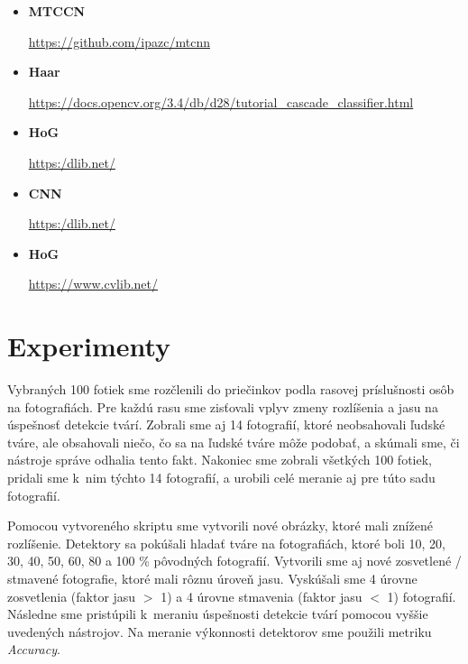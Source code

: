 \documentclass[]{article}
\begin{document}
	\begin{itemize}
		\item \textbf{MTCCN}
		
		\url{https://github.com/ipazc/mtcnn}
		
		\item \textbf{Haar}
		
		\url{https://docs.opencv.org/3.4/db/d28/tutorial_cascade_classifier.html}
		
		\item \textbf{HoG}
		
		\url{https:/dlib.net/}
		
		\item \textbf{CNN}
		
		\url{https:/dlib.net/}
		
		\item \textbf{HoG}
		
		\url{https://www.cvlib.net/}
	\end{itemize}
	
	\section{Experimenty}
	
	Vybraných 100 fotiek sme rozčlenili do priečinkov podla rasovej príslušnosti osôb na fotografiách. Pre každú rasu sme zisťovali vplyv zmeny rozlíšenia a jasu na úspešnosť detekcie tvárí. Zobrali sme aj 14 fotografií, ktoré neobsahovali ľudské tváre, ale obsahovali niečo, čo sa na ľudské tváre môže podobať, a skúmali sme, či nástroje správe odhalia tento fakt. Nakoniec sme zobrali všetkých 100 fotiek, pridali sme k~nim týchto 14 fotografií, a urobili celé meranie aj pre túto sadu fotografií.
	
	Pomocou vytvoreného skriptu sme vytvorili nové obrázky, ktoré mali znížené rozlíšenie. Detektory sa pokúšali hladať tváre na fotografiách, ktoré boli 10, 20, 30, 40, 50, 60, 80 a 100 \% pôvodných fotografií. Vytvorili sme aj nové zosvetlené / stmavené fotografie, ktoré mali rôznu úroveň jasu. Vyskúšali sme 4 úrovne zosvetlenia (faktor jasu $>$ 1) a 4 úrovne stmavenia (faktor jasu $<$ 1) fotografií. Následne sme pristúpili k~meraniu úspešnosti detekcie tvárí pomocou vyššie uvedených nástrojov. Na meranie výkonnosti detektorov sme použili metriku \textit{Accuracy}.
	
\end{document}
